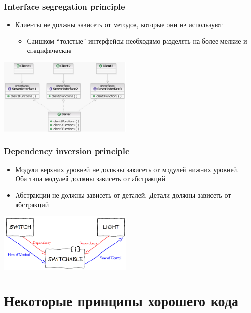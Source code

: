 \documentclass[xetex,mathserif,serif]{beamer}
\begin{document}
	\begin{frame}
		\frametitle{Interface segregation principle}
		\begin{itemize}
			\item Клиенты не должны зависеть от методов, которые они не используют
			\begin{itemize}
				\item Слишком ``толстые'' интерфейсы необходимо разделять на более мелкие и специфические
			\end{itemize}
		\end{itemize}
		\begin{flushright}
			\includegraphics[width=0.5\textwidth]{interfaceSegregationPrinciple.png}
		\end{flushright}
	\end{frame}

	\begin{frame}
		\frametitle{Dependency inversion principle}
		\begin{itemize}
			\item Модули верхних уровней не должны зависеть от модулей нижних уровней. Оба типа модулей должны зависеть от абстракций
			\item Абстракции не должны зависеть от деталей. Детали должны зависеть от абстракций
		\end{itemize}
		\begin{flushright}
			\includegraphics[width=0.5\textwidth]{dependencyInversionPrinciple.png}
		\end{flushright}
	\end{frame}

	\section{Некоторые принципы хорошего кода}
\end{document}

